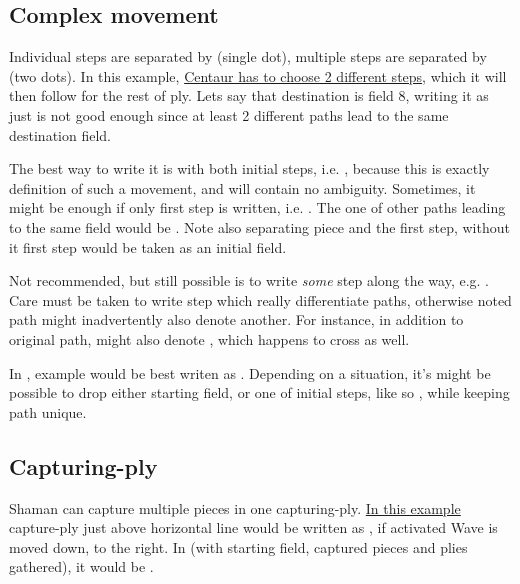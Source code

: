 \subsection*{Complex movement}
\label{sec:Appendix/Notation/Complex movement}

Individual steps are separated by  (single dot), multiple steps are separated by
 (two dots). In this example,
\hyperref[fig:scn_hd_05_centaur_multi_step]{Centaur has to choose 2 different steps},
which it will then follow for the rest of ply. Lets say that destination is field 8,
writing it as just  is not good enough since at least 2 different paths lead
to the same destination field.

The best way to write it is with both initial steps, i.e. , because
this is exactly definition of such a movement, and will contain no ambiguity. Sometimes,
it might be enough if only first step is written, i.e. . The one of other
paths leading to the same  field would be . Note also 
separating piece and the first step, without it first step would be taken as an initial
field.

Not recommended, but still possible is to write \emph{some} step along the way, e.g.
. Care must be taken to write step which really differentiate paths,
otherwise noted path might inadvertently also denote another. For instance, in addition
to original path,  might also denote , which happens
to cross  as well.

In , example would be best writen as . Depending on a
situation, it's might be possible to drop either starting field, or one of initial steps,
like so , while keeping path unique.

\subsection*{Capturing-ply}
\label{sec:Appendix/Notation/Capturing-ply}

Shaman can capture multiple pieces in one capturing-ply.
\hyperref[fig:scn_cot_03_light_shaman_capture_ply]{In this example} capture-ply just above
horizontal line would be written as , if activated Wave is moved
down, to the right. In  (with starting field, captured pieces and plies gathered),
it would be \alg{[Hd9.h10*P.l11*P.p12]\~{}[Wp12-n8]}.

